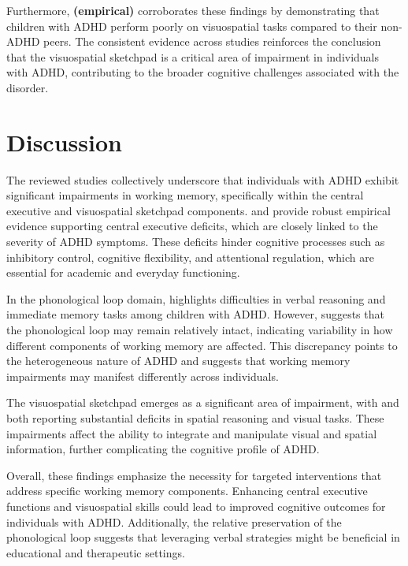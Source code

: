 \documentclass[stu]{apa7}
\begin{document}
Furthermore, \textcite{elosua_differences_2017} \textbf{(empirical)} corroborates these findings by demonstrating that children with ADHD perform poorly on visuospatial tasks compared to their non-ADHD peers. The consistent evidence across studies reinforces the conclusion that the visuospatial sketchpad is a critical area of impairment in individuals with ADHD, contributing to the broader cognitive challenges associated with the disorder.

\section{Discussion}

The reviewed studies collectively underscore that individuals with ADHD exhibit significant impairments in working memory, specifically within the central executive and visuospatial sketchpad components. \textcite{kofler_working_2020} and \textcite{elosua_differences_2017} provide robust empirical evidence supporting central executive deficits, which are closely linked to the severity of ADHD symptoms. These deficits hinder cognitive processes such as inhibitory control, cognitive flexibility, and attentional regulation, which are essential for academic and everyday functioning.

In the phonological loop domain, \textcite{fried_clinical_2016} highlights difficulties in verbal reasoning and immediate memory tasks among children with ADHD. However, \textcite{kofler_working_2020} suggests that the phonological loop may remain relatively intact, indicating variability in how different components of working memory are affected. This discrepancy points to the heterogeneous nature of ADHD and suggests that working memory impairments may manifest differently across individuals.

The visuospatial sketchpad emerges as a significant area of impairment, with \textcite{butzbach_basic_2019} and \textcite{elosua_differences_2017} both reporting substantial deficits in spatial reasoning and visual tasks. These impairments affect the ability to integrate and manipulate visual and spatial information, further complicating the cognitive profile of ADHD.

Overall, these findings emphasize the necessity for targeted interventions that address specific working memory components. Enhancing central executive functions and visuospatial skills could lead to improved cognitive outcomes for individuals with ADHD. Additionally, the relative preservation of the phonological loop suggests that leveraging verbal strategies might be beneficial in educational and therapeutic settings.
\end{document}
